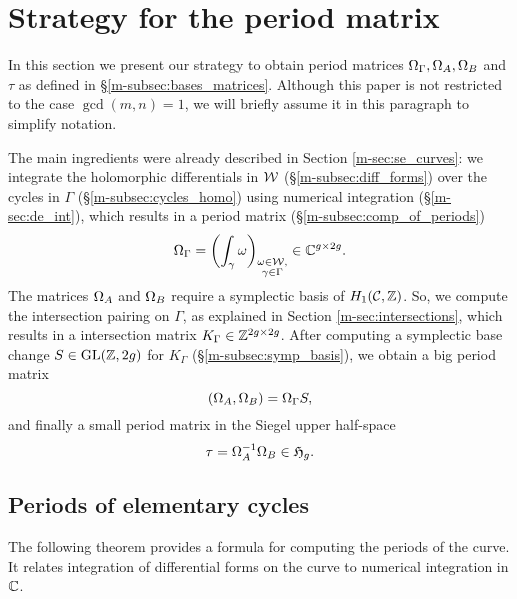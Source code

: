 \documentclass[main.tex]{subfiles}
\begin{document}
  \section{Strategy for the period matrix}\label{sec:strat_pm}

  In this section we present our strategy to obtain period matrices $\Omega_{\Gamma}, \Omega_A, \Omega_B$ and $\tau$ as defined in
  \S \ref{m-subsec:bases_matrices}. Although this paper is not restricted to the
  case $\gcd(m,n) = 1$, we will briefly assume it in this paragraph to simplify notation.

  The main ingredients were already described in
  Section \ref{m-sec:se_curves}: we integrate the holomorphic differentials in $\mathcal{W}$ (\S \ref{m-subsec:diff_forms})
  over the cycles in $\Gamma$ (\S \ref{m-subsec:cycles_homo}) using numerical integration (\S \ref{m-sec:de_int}), which results in a period matrix (\S \ref{m-subsec:comp_of_periods})
  \begin{equation*}
      \label{eq:OC}
    \Omega_{\Gamma} = \left( \int_{\gamma} \omega \right)_{\substack{\omega \in \mathcal{W}, \\ \gamma \in \Gamma}} \in \mathbb{C}^{g \times 2g}.
  \end{equation*}
  The matrices $\Omega_A$ and $\Omega_B$ require a symplectic basis of $H_1(\mathcal{C},\mathbb{Z})$.
  So, we compute the intersection pairing on $\Gamma$, as explained in Section \ref{m-sec:intersections}, which results in a
  intersection matrix $K_{\Gamma} \in \mathbb{Z}^{2g \times 2g}$.
  After computing a symplectic base change $S \in \operatorname{GL}(\mathbb{Z},2g)$ for $K_{\Gamma}$ (\S \ref{m-subsec:symp_basis}), we obtain a big period matrix
  \begin{equation}
      \label{eq:OAOB}
      (\Omega_A,\Omega_B) = \Omega_{\Gamma} S,
  \end{equation}
   and finally a small period matrix in the Siegel upper half-space
  \begin{equation}
      \label{eq:tau}
   \tau = \Omega_A^{-1} \Omega_B \in \mathfrak{H}_g.
  \end{equation}

  \bigskip

  \subsection{Periods of elementary cycles}\label{subsec:comp_of_periods}

  The following theorem provides a formula for computing the periods of the curve.
  It relates integration of differential forms on the curve to numerical integration in $\mathbb{C}$.
\end{document}
